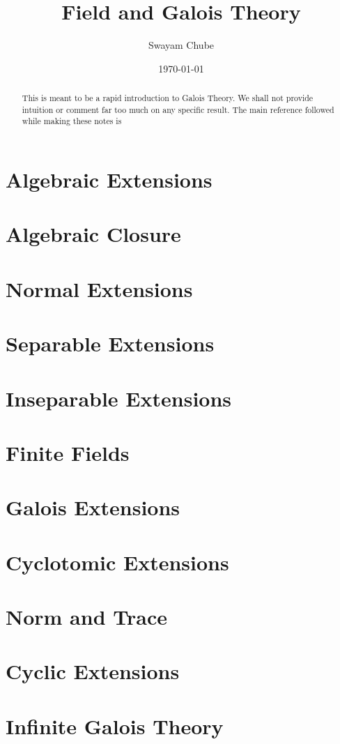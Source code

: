 \documentclass{report}
\title{Field and Galois Theory}
\author{Swayam Chube}
\date{\today}
\begin{document}
\maketitle

\begin{abstract}
    This is meant to be a rapid introduction to Galois Theory. We shall not provide intuition or comment far too much on any specific result. The main reference followed while making these notes is \cite{Lan02}
\end{abstract}

\tableofcontents

\chapter{Algebraic Extensions}
 

\chapter{Algebraic Closure}


\chapter{Normal Extensions}


\chapter{Separable Extensions}


\chapter{Inseparable Extensions}


\chapter{Finite Fields}


\chapter{Galois Extensions}


\chapter{Cyclotomic Extensions}


\chapter{Norm and Trace}


\chapter{Cyclic Extensions}


\chapter{Infinite Galois Theory}




\end{document}
